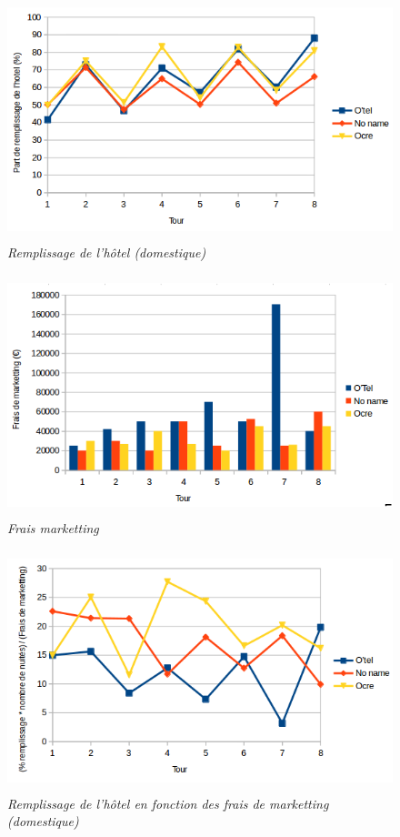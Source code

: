 \documentclass[a4paper,10pt]{article}
\begin{document}
    \begin{figure}[!ht]
      \begin{center}
	\includegraphics[height=7cm,keepaspectratio]{./images/remplissage_hotel.png}
      \end{center}
      \caption{\textit{Remplissage de l'hôtel (domestique)}}
      \label{remplissage_hotel}
    \end{figure}
    
    \begin{figure}[!ht]
      \begin{center}
	\includegraphics[height=7cm,keepaspectratio]{./images/frais_marketting.png}
      \end{center}
      \caption{\textit{Frais marketting}}
    \end{figure}
    
    \begin{figure}[!ht]
      \begin{center}
	\includegraphics[height=7cm,keepaspectratio]{./images/marketting_part_marche.png}
      \end{center}
      \caption{\textit{Remplissage de l'hôtel en fonction des frais de marketting (domestique)}}
      \label{marketting_part_marche}
    \end{figure}
    
\end{document}
